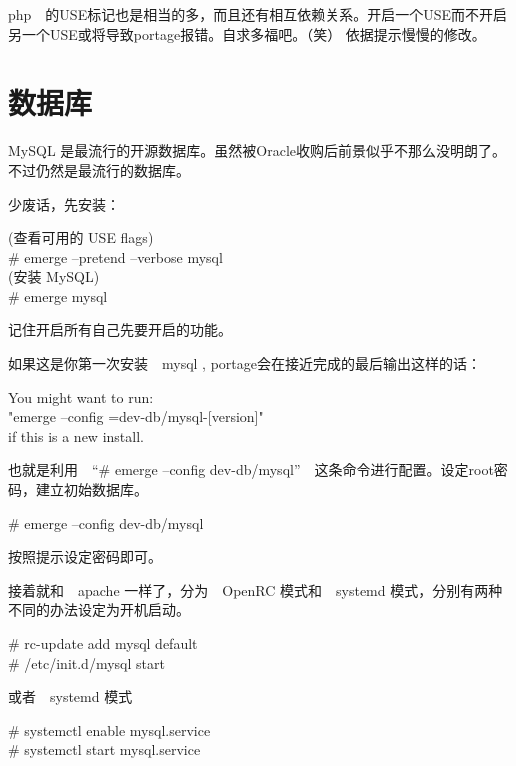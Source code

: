 \begin{notice}
php　的USE标记也是相当的多，而且还有相互依赖关系。开启一个USE而不开启另一个USE或将导致portage报错。自求多福吧。（笑）
依据提示慢慢的修改。
\end{notice}

\section{数据库}

MySQL 是最流行的开源数据库。虽然被Oracle收购后前景似乎不那么没明朗了。不过仍然是最流行的数据库。

少废话，先安装：

\begin{code}
(查看可用的 USE flags) \\
\# emerge --pretend --verbose mysql \\
(安装 MySQL) \\
\# emerge mysql
\end{code}

记住开启所有自己先要开启的功能。

如果这是你第一次安装　mysql , portage会在接近完成的最后输出这样的话：

\begin{code}
You might want to run:　\\
"emerge --config =dev-db/mysql-[version]" \\
if this is a new install.
\end{code}

也就是利用　“\# emerge --config  dev-db/mysql”　这条命令进行配置。设定root密码，建立初始数据库。

\begin{code}
\# emerge --config  dev-db/mysql
\end{code}

按照提示设定密码即可。

接着就和　apache 一样了，分为　OpenRC 模式和　systemd 模式，分别有两种不同的办法设定为开机启动。

\begin{code}
\# rc-update add mysql default\\
\# /etc/init.d/mysql start
\end{code}

或者　systemd 模式

\begin{code}
\# systemctl enable mysql.service\\
\# systemctl start mysql.service
\end{code}

